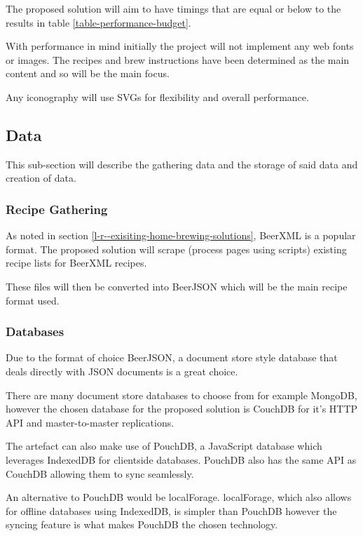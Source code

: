 The proposed solution will aim to have timings that are equal or below to the results in table \ref{table-performance-budget}.

With performance in mind initially the project will not implement any web fonts or images. The recipes and brew instructions have been determined as the main content and so will be the main focus.

Any iconography will use SVGs for flexibility and overall performance.

\subsection{Data} \label{a-d--data}

This sub-section will describe the gathering data and the storage of said data and creation of data.

\subsubsection{Recipe Gathering} \label{a-d--d--recipe-gathering}

As noted in section \ref{l-r--exisiting-home-brewing-solutions}, BeerXML is a popular format.
The proposed solution will scrape (process pages using scripts) existing recipe lists for BeerXML recipes.

These files will then be converted into BeerJSON which will be the main recipe format used.

\subsubsection{Databases} \label{a-d--d--databases}

Due to the format of choice BeerJSON, a document store style database that deals directly with JSON documents is a great choice.

There are many document store databases to choose from for example MongoDB, however the chosen database for the proposed solution is CouchDB for it's HTTP API and master-to-master replications. \cite{couchdb}

The artefact can also make use of PouchDB, a JavaScript database which leverages IndexedDB for clientside databases. PouchDB also has the same API as CouchDB allowing them to sync seamlessly.

An alternative to PouchDB would be localForage. localForage, which also allows for offline databases using IndexedDB, is simpler than PouchDB however the syncing feature is what makes PouchDB the chosen technology.

